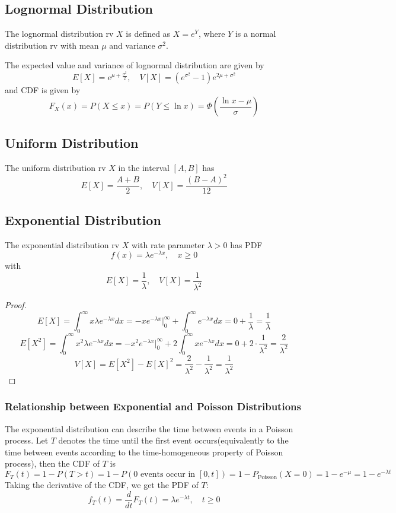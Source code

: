 \documentclass{template}
\newcommand{\Poisson}{\text{Poisson}}
\begin{document}
\subsection{Lognormal Distribution}
The lognormal distribution rv \( X \) is defined as \( X = e^Y \), where \( Y \) is
a normal distribution rv with mean \( \mu \) and variance \( \sigma^2 \). 

The expected value and variance of lognormal distribution are given by
\[
	E[X] = e^{\mu + \frac{\sigma^2}{2}}, \quad V[X] = (e^{\sigma^2} - 1) e^{2\mu + \sigma^2}
\] 
and CDF is given by
\[
	F_X(x) = P(X \leq x) = P(Y \leq \ln x) = \Phi\left(\frac{\ln x - \mu}{\sigma}\right)
\] 

\subsection{Uniform Distribution}
The uniform distribution rv \( X \) in the interval \( [A, B] \) 
has
\[
	E[X] = \frac{A+B}{2}, \quad V[X] = \frac{(B-A)^2}{12}
\] 
\subsection{Exponential Distribution}
The exponential distribution rv \( X \) with rate parameter \( \lambda > 0 \) has
PDF
\[
	f(x) = \lambda e^{-\lambda x}, \quad x \geq 0
\] 
with
\[
	E[X] = \frac{1}{\lambda}, \quad V[X] = \frac{1}{\lambda^2}
\] 
\begin{proof}
	\[
		E[X] = \int_{0}^{\infty} x \lambda e^{-\lambda x} dx
		= -x e^{-\lambda x} \Big|_{0}^{\infty} + \int_{0}^{\infty} e^{-\lambda x} dx
		= 0 + \frac{1}{\lambda} = \frac{1}{\lambda}
	\] 
	\[
		E[X^2] = \int_{0}^{\infty} x^2 \lambda e^{-\lambda x} dx
		= -x^2 e^{-\lambda x} \Big|_{0}^{\infty} + 2 \int_{0}^{\infty} x e^{-\lambda x} dx
		= 0 + 2 \cdot \frac{1}{\lambda^2} = \frac{2}{\lambda^2}
	\] 
	\[
		V[X] = E[X^2] - E[X]^2 = \frac{2}{\lambda^2} - \frac{1}{\lambda^2} = \frac{1}{\lambda^2}
	\] 
\end{proof}

\subsubsection{Relationship between Exponential and Poisson Distributions}
The exponential distribution can describe the time between events in a Poisson
process. Let $T$ denotes the time until the first event occurs(equivalently to the time between events
according to the time-homogeneous property of Poisson process), then the CDF of $T$ is
\[
	F_T(t) = 1-P(T > t) = 1-P(0 \text{ events occur in } [0, t]) = 1-P_{\Poisson}(X=0) = 1-e^{-\mu} 
	= 1-e^{-\lambda t}
\] 
Taking the derivative of the CDF, we get the PDF of $T$:
\[
	f_T(t) = \frac{d}{dt} F_T(t) = \lambda e^{-\lambda t}, \quad t \geq 0
\] 
\end{document}
